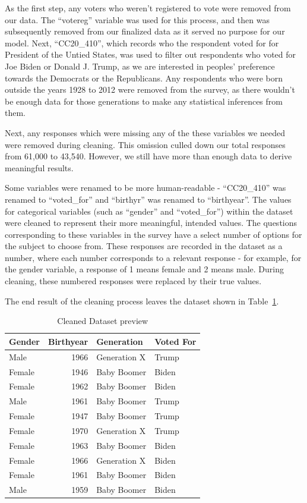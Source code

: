 \documentclass[
  letterpaper,
  DIV=11,
  numbers=noendperiod]{scrartcl}
\begin{document}
As the first step, any voters who weren't registered to vote were
removed from our data. The ``votereg'' variable was used for this
process, and then was subsequently removed from our finalized data as it
served no purpose for our model. Next, ``CC20\_410'', which records who
the respondent voted for for President of the Untied States, was used to
filter out respondents who voted for Joe Biden or Donald J. Trump, as we
are interested in peoples' preference towards the Democrats or the
Republicans. Any respondents who were born outside the years 1928 to
2012 were removed from the survey, as there wouldn't be enough data for
those generations to make any statistical inferences from them.

Next, any responses which were missing any of the these variables we
needed were removed during cleaning. This omission culled down our total
responses from 61,000 to 43,540. However, we still have more than enough
data to derive meaningful results.

Some variables were renamed to be more human-readable - ``CC20\_410''
was renamed to ``voted\_for'' and ``birthyr'' was renamed to
``birthyear''. The values for categorical variables (such as ``gender''
and ``voted\_for'') within the dataset were cleaned to represent their
more meaningful, intended values. The questions corresponding to these
variables in the survey have a select number of options for the subject
to choose from. These responses are recorded in the dataset as a number,
where each number corresponds to a relevant response - for example, for
the gender variable, a response of 1 means female and 2 means male.
During cleaning, these numbered responses were replaced by their true
values.

The end result of the cleaning process leaves the dataset shown in
Table~\ref{tbl-cleaned-data-preview}.

\hypertarget{tbl-cleaned-data-preview}{}
\begin{table}
\caption{\label{tbl-cleaned-data-preview}Cleaned Dataset preview }\tabularnewline

\centering
\begin{tabular}{lrll}
\toprule
Gender & Birthyear & Generation & Voted For\\
\midrule
Male & 1966 & Generation X & Trump\\
Female & 1946 & Baby Boomer & Biden\\
Female & 1962 & Baby Boomer & Biden\\
Male & 1961 & Baby Boomer & Trump\\
Female & 1947 & Baby Boomer & Trump\\
\addlinespace
Female & 1970 & Generation X & Trump\\
Female & 1963 & Baby Boomer & Biden\\
Female & 1966 & Generation X & Biden\\
Female & 1961 & Baby Boomer & Biden\\
Male & 1959 & Baby Boomer & Biden\\
\bottomrule
\end{tabular}
\end{table}
\end{document}
